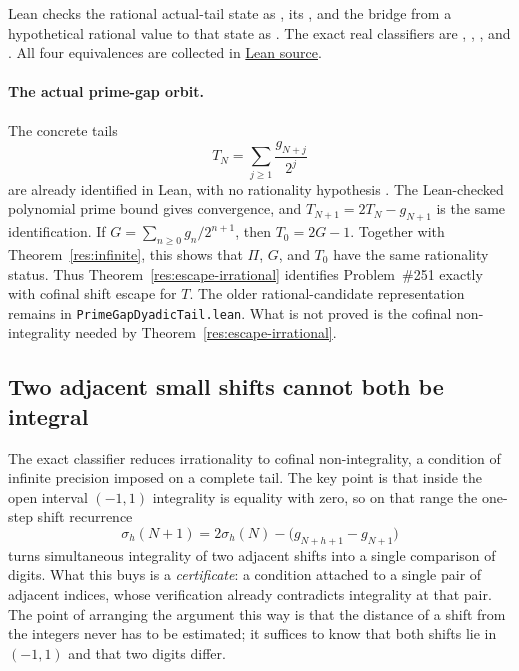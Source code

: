\documentclass[11pt]{article}
\begin{document}
\noindent Lean checks the rational actual-tail state as
, its
,
and the bridge from a hypothetical rational value to that state as
.  The exact real classifiers are
,
,
, and
.  All four equivalences are collected in
\href{https://github.com/wcook04/plectis-erdos/blob/f36a98bf3d3e6f65f1074e3b800e3293d5b8a51a/ErdosProblems/Erdos251/PaperCoreR7.lean#L94}{Lean source}.

\paragraph{The actual prime-gap orbit.}
The concrete tails
\[
 T_N=\sum_{j\ge1}\frac{g_{N+j}}{2^j}
\]
are already identified in Lean, with no rationality hypothesis
.
The Lean-checked polynomial prime bound gives convergence, and
$T_{N+1}=2T_N-g_{N+1}$ is the same identification.  If
$G=\sum_{n\ge0}g_n/2^{n+1}$, then $T_0=2G-1$.  Together with
Theorem~\ref{res:infinite}, this shows that $\Pi$, $G$, and
$T_0$ have the same rationality status.  Thus
Theorem~\ref{res:escape-irrational} identifies Problem~\#251 exactly with
cofinal shift escape for $T$.  The older rational-candidate representation
remains in \texttt{PrimeGapDyadicTail.lean}.  What is not
proved is the cofinal non-integrality needed by
Theorem~\ref{res:escape-irrational}.

\subsection{Two adjacent small shifts cannot both be integral}\label{sec:local-certificate}

The exact classifier reduces irrationality to cofinal non-integrality, a
condition of infinite precision imposed on a complete tail.  The key
point is that inside the open interval $(-1,1)$ integrality is equality with
zero, so on that range the one-step shift recurrence
\[
 \sigma_h(N+1)=2\sigma_h(N)-\bigl(g_{N+h+1}-g_{N+1}\bigr)
\]
turns simultaneous integrality of two adjacent shifts into a single comparison
of digits.  What this buys is a \emph{certificate}: a condition attached to a
single pair of adjacent indices, whose verification already contradicts
integrality at that pair.  The point of arranging the argument this
way is that the distance of a shift from the integers never has to be
estimated; it suffices to know that both shifts lie in $(-1,1)$ and that two
digits differ.
\end{document}
